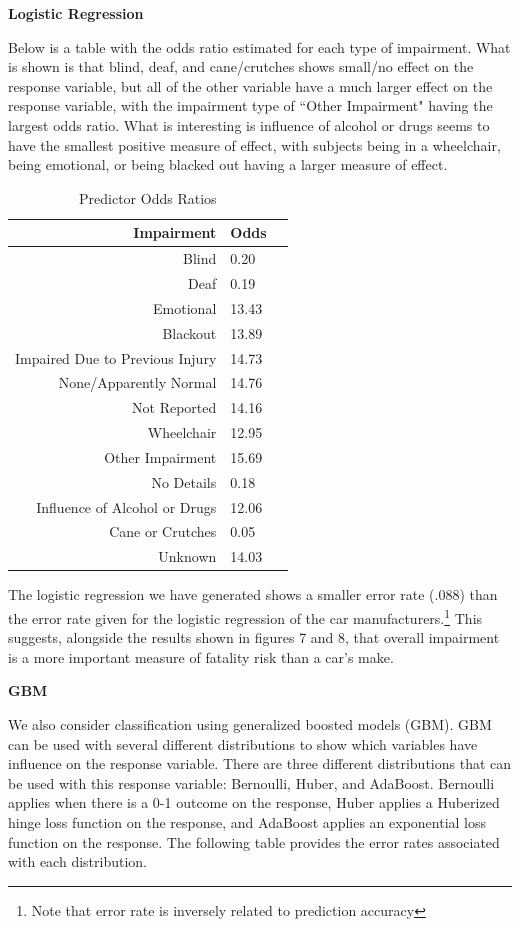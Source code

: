 \documentclass[11pt, oneside,titlepage]{article}   	%
\begin{document}
\textbf{Logistic Regression}

Below is a table with the odds ratio estimated for each type of impairment. What is shown is that blind, deaf, and cane/crutches shows small/no effect on the response variable, but all of the other variable have a much larger effect on the response variable, with the impairment type of ``Other Impairment" having the largest odds ratio. What is interesting is influence of alcohol or drugs seems to have the smallest positive measure of effect, with subjects being in a wheelchair, being emotional, or being blacked out having a larger measure of effect.

\begin{table}[H]
\centering
\begin{tabular}{rlr}
  \hline
 Impairment & Odds \\ 
  \hline
Blind & 0.20 \\ 
  Deaf & 0.19 \\ 
  Emotional & 13.43 \\ 
  Blackout & 13.89 \\ 
  Impaired Due to Previous Injury & 14.73 \\ 
  None/Apparently Normal & 14.76 \\ 
  Not Reported & 14.16 \\ 
  Wheelchair & 12.95 \\ 
  Other Impairment & 15.69 \\ 
  No Details & 0.18 \\ 
  Influence of Alcohol or Drugs & 12.06 \\ 
  Cane or Crutches & 0.05 \\ 
  Unknown & 14.03 \\ 
   \hline
\end{tabular}
\caption{Predictor Odds Ratios}
\end{table}

The logistic regression we have generated shows a smaller error rate (.088) than the error rate given for the logistic regression of the car manufacturers.\footnote{Note that error rate is inversely related to prediction accuracy} This suggests, alongside the results shown in figures 7 and 8, that overall impairment is a more important measure of fatality risk than a car's make.

\textbf{GBM}

We also consider classification using generalized boosted models (GBM). GBM can be used with several different distributions to show which variables have influence on the response variable. There are three different distributions that can be used with this response variable: Bernoulli, Huber, and AdaBoost. Bernoulli applies when there is a 0-1 outcome on the response, Huber applies a Huberized hinge loss function on the response, and AdaBoost applies an exponential loss function on the response. The following table provides the error rates associated with each distribution.
\end{document}
